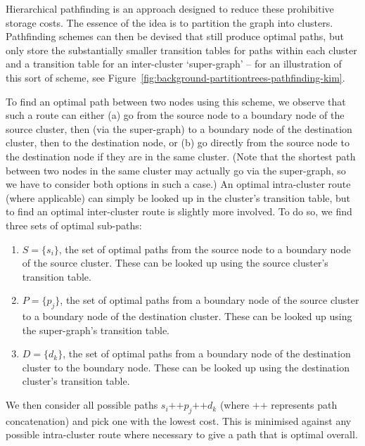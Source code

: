 
Hierarchical pathfinding is an approach designed to reduce these prohibitive storage costs. The essence of the idea is to partition the graph into clusters. Pathfinding schemes can then be devised that still produce optimal paths, but only store the substantially smaller transition tables for paths within each cluster and a transition table for an inter-cluster `super-graph' -- for an illustration of this sort of scheme, see Figure~\ref{fig:background-partitiontrees-pathfinding-kim}.


To find an optimal path between two nodes using this scheme, we observe that such a route can either (a) go from the source node to a boundary node of the source cluster, then (via the super-graph) to a boundary node of the destination cluster, then to the destination node, or (b) go directly from the source node to the destination node if they are in the same cluster. (Note that the shortest path between two nodes in the same cluster may actually go via the super-graph, so we have to consider both options in such a case.) An optimal intra-cluster route (where applicable) can simply be looked up in the cluster's transition table, but to find an optimal inter-cluster route is slightly more involved. To do so, we find three sets of optimal sub-paths:
%
\begin{enumerate}

\item $S = \{s_i\}$, the set of optimal paths from the source node to a boundary node of the source cluster. These can be looked up using the source cluster's transition table.
\item $P = \{p_j\}$, the set of optimal paths from a boundary node of the source cluster to a boundary node of the destination cluster. These can be looked up using the super-graph's transition table.
\item $D = \{d_k\}$, the set of optimal paths from a boundary node of the destination cluster to the boundary node. These can be looked up using the destination cluster's transition table.

\end{enumerate}
%
We then consider all possible paths $s_i \mbox{++} p_j \mbox{++} d_k$ (where $\mbox{++}$ represents path concatenation) and pick one with the lowest cost. This is minimised against any possible intra-cluster route where necessary to give a path that is optimal overall.

